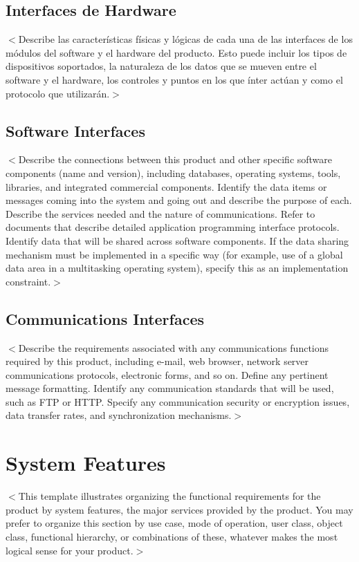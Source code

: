 \documentclass{scrreprt}
\begin{document}
\section{Interfaces de Hardware}
$<$Describe las características físicas y lógicas de cada una de las interfaces de los módulos del software y el hardware del producto. Esto puede incluir los tipos de dispositivos soportados, la naturaleza de los datos que se mueven entre el software y el hardware, los controles y puntos en los que ínter actúan y como el protocolo que utilizarán.$>$ 

\section{Software Interfaces}
$<$Describe the connections between this product and other specific software 
components (name and version), including databases, operating systems, tools, 
libraries, and integrated commercial components. Identify the data items or 
messages coming into the system and going out and describe the purpose of each.  
Describe the services needed and the nature of communications. Refer to 
documents that describe detailed application programming interface protocols.  
Identify data that will be shared across software components. If the data 
sharing mechanism must be implemented in a specific way (for example, use of a 
global data area in a multitasking operating system), specify this as an 
implementation constraint.$>$

\section{Communications Interfaces}
$<$Describe the requirements associated with any communications functions 
required by this product, including e-mail, web browser, network server 
communications protocols, electronic forms, and so on. Define any pertinent 
message formatting. Identify any communication standards that will be used, such 
as FTP or HTTP. Specify any communication security or encryption issues, data 
transfer rates, and synchronization mechanisms.$>$


\chapter{System Features}
$<$This template illustrates organizing the functional requirements for the 
product by system features, the major services provided by the product. You may 
prefer to organize this section by use case, mode of operation, user class, 
object class, functional hierarchy, or combinations of these, whatever makes the 
most logical sense for your product.$>$
\end{document}

